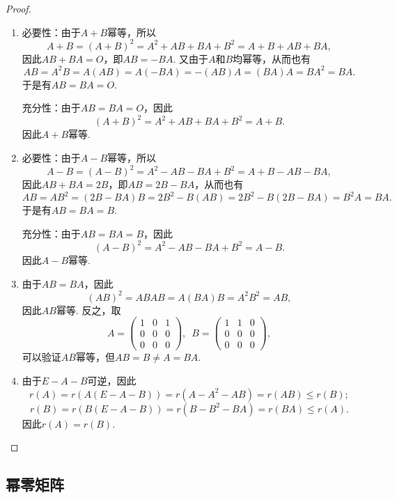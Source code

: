 \begin{proof}
    \begin{enumerate}
        \item 必要性：由于$A+B$幂等，所以
              \[A+B=(A+B)^2=A^2+AB+BA+B^2=A+B+AB+BA,\]
              因此$AB+BA=O$，即$AB=-BA$. 又由于$A$和$B$均幂等，从而也有
              \[AB=A^2B=A(AB)=A(-BA)=-(AB)A=(BA)A=BA^2=BA.\]
              于是有$AB=BA=O$.

              充分性：由于$AB=BA=O$，因此
              \[(A+B)^2=A^2+AB+BA+B^2=A+B.\]
              因此$A+B$幂等.

        \item 必要性：由于$A-B$幂等，所以
              \[A-B=(A-B)^2=A^2-AB-BA+B^2=A+B-AB-BA,\]
              因此$AB+BA=2B$，即$AB=2B-BA$，从而也有
              \[AB=AB^2=(2B-BA)B=2B^2-B(AB)=2B^2-B(2B-BA)=B^2A=BA.\]
              于是有$AB=BA=B$.

              充分性：由于$AB=BA=B$，因此
              \[(A-B)^2=A^2-AB-BA+B^2=A-B.\]
              因此$A-B$幂等.

        \item 由于$AB=BA$，因此
              \[(AB)^2=ABAB=A(BA)B=A^2B^2=AB,\]
              因此$AB$幂等. 反之，取
              \[A=\begin{pmatrix}
                      1 & 0 & 1 \\ 0 & 0 & 0 \\ 0 & 0 & 0
                  \end{pmatrix},\enspace B=\begin{pmatrix}
                      1 & 1 & 0 \\ 0 & 0 & 0 \\ 0 & 0 & 0
                  \end{pmatrix},\]
              可以验证$AB$幂等，但$AB=B\neq A=BA$.

        \item 由于$E-A-B$可逆，因此
              \[r(A)=r(A(E-A-B))=r(A-A^2-AB)=r(AB)\leqslant r(B);\]
              \[r(B)=r(B(E-A-B))=r(B-B^2-BA)=r(BA)\leqslant r(A).\]
              因此$r(A)=r(B)$.
    \end{enumerate}
\end{proof}

\subsection{幂零矩阵}

